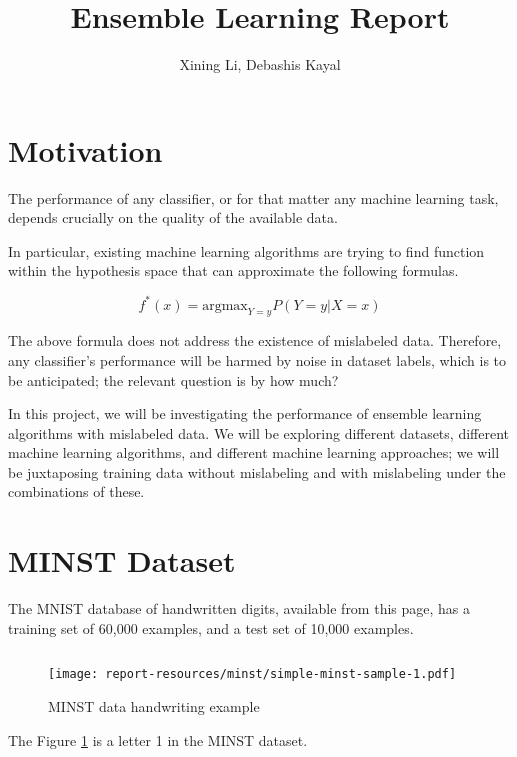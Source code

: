 \documentclass{article}
\author{Xining Li, Debashis Kayal}
\title {Ensemble Learning Report}
\begin{document}
\maketitle

\section{Motivation}

The performance of any classifier, or for that matter any machine learning task, depends crucially on the quality of the available data. 


In particular, existing machine learning algorithms are trying to find function within the hypothesis space that can approximate the following formulas. 

\begin{equation}
    f^*(x) = {\mathrm {argmax}}_{Y=y} P (Y=y|X=x)
\end{equation}

The above formula does not address the existence of mislabeled data. Therefore, any classifier's performance will be harmed by noise in dataset labels, which is to be anticipated; the relevant question is by how much? 

In this project, we will be investigating the performance of ensemble learning algorithms with mislabeled data. We will be exploring different datasets, different machine learning algorithms, and different machine learning approaches; we will be juxtaposing training data without mislabeling and with mislabeling under the combinations of these. 

\section{MINST Dataset}

The MNIST database of handwritten digits, available from this page, has a training set of 60,000 examples, and a test set of 10,000 examples. 

\inputminted[firstline=16,lastline=20,frame=single,framesep=10pt]{python}{minst/main.py}

\begin{figure}[H]
    \centering
    \texttt{[image: report-resources/minst/simple-minst-sample-1.pdf]}
    \caption{MINST data handwriting example}
    \label{fig:let1}
\end{figure}

The Figure \ref{fig:let1} is a letter 1 in the MINST dataset. 
\end{document}
